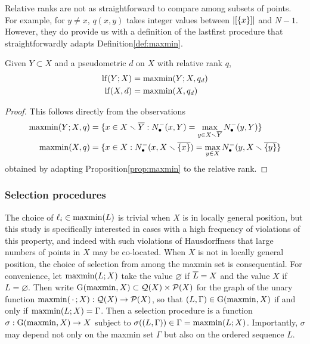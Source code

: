 \documentclass{article}
\begin{document}
Relative ranks are not as straightforward to compare among subsets of
points. For example, for \(y\neq x\), \(q(x,y)\) takes integer values
between \(\lvert [\{x\}]\rvert\) and \(N-1\). However, they do provide us
with a definition of the lastfirst procedure that straightforwardly
adapts Definition\nbs\ref{def:maxmin}.

\begin{corollary}
    Given $Y\subset X$ and a pseudometric $d$ on $X$ with relative rank $q$,
    \begin{align*}
        \operatorname{lf}(Y;X) &= \operatorname{maxmin}(Y;X,q_d) \\
        \operatorname{lf}(X,d) &= \operatorname{maxmin}(X,q_d)
    \end{align*}
\end{corollary}

\begin{proof}
This follows directly from the observations
\begin{align*}
    \operatorname{maxmin}(Y;X,q) &= \{x\in X\smallsetminus \overline{Y} : N_\bullet^-(x,Y) = \max_{y\in X\smallsetminus \overline{Y}}{N_\bullet^-(y,Y)}\} \\
    \operatorname{maxmin}(X,q) &= \{x\in X : N_\bullet^-(x,X \smallsetminus \overline{\{x\}}) = \max_{y\in X}{N_\bullet^-(y,X \smallsetminus \overline{\{y\}}}\}
\end{align*}
obtained by adapting Proposition\nbs\ref{prop:maxmin} to the relative rank.
\end{proof}

\hypertarget{selection-procedures}{%
\subsubsection{Selection procedures}\label{selection-procedures}}

The choice of \(\ell_i \in \operatorname{maxmin}(L)\) is trivial when \(X\) is in
locally general position, but this study is specifically interested in
cases with a high frequency of violations of this property, and indeed
with such violations of Hausdorffness that large numbers of points in
\(X\) may be co-located. When \(X\) is not in locally general position,
the choice of selection from among the maxmin set is consequential. For
convenience, let \(\operatorname{maxmin}(L;X)\) take the value \(\varnothing\) if
\(\overline{L}=X\) and the value \(X\) if \(L=\varnothing\). Then write
\(\operatorname{G}(\operatorname{maxmin}, X) \subset \mathcal{Q}(X) \times \mathcal{P}(X)\) for the graph
of the unary function \(\operatorname{maxmin}(\,\cdot\,;X): \mathcal{Q}(X) \to \mathcal{P}(X)\),
so that \((L,\Gamma) \in \operatorname{G}(\operatorname{maxmin}, X)\) if and only if
\(\operatorname{maxmin}(L;X) = \Gamma\). Then a selection procedure is a function
\(\sigma: \operatorname{G}(\operatorname{maxmin}, X) \to X\) subject to
\(\sigma((L,\Gamma)) \in \Gamma = \operatorname{maxmin}(L;X)\). Importantly,
\(\sigma\) may depend not only on the maxmin set \(\Gamma\) but also on
the ordered sequence \(L\).
\end{document}
